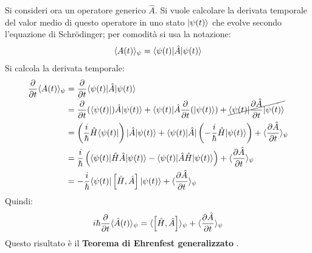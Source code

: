 Si consideri ora un operatore generico $\hat A$. Si vuole calcolare la derivata temporale del valor medio di questo operatore in uno stato $|\psi(t)\ket$ che evolve secondo l'equazione di Schrödinger; per comodità si usa la notazione:
\[
	\bra A(t) \ket_\psi = \bra \psi(t) | \hat A | \psi(t) \ket
\]
Si calcola la derivata temporale:
\begin{align*}
	\deriv[t]{} \bra A(t) \ket_\psi &= \deriv[t]{} \bra \psi(t) | \hat A | \psi(t) \ket \\
	&= \deriv[t]{} (\bra  \psi(t) |) \hat A | \psi(t) \ket + \bra \psi(t) | \hat A \deriv[t]{} (|  \psi(t) \ket) + \cancel{\bra \psi(t) | \deriv[t]{\hat A} | \psi(t) \ket} \\
	&= \left( \frac{i}{\hbar} \hat H \bra\psi(t)| \right) | \hat A | \psi(t) \ket + \bra \psi(t) | \hat A | \left( -\frac{i}{\hbar} \hat H |\psi(t)\ket \right) + \avg[\psi]{\tderiv{\hat A}} \\
	&= \frac{i}{\hbar} \left( \bra \psi(t) | \hat H \hat A | \psi(t) \ket - \bra \psi(t) | \hat A \hat H | \psi(t) \ket \right) + \avg[\psi]{\tderiv{\hat A}} \\
	&= -\frac{i}{\hbar} \bra \psi(t) | \left[ \hat H, \hat A \right] | \psi(t) \ket + \avg[\psi]{\tderiv{\hat A}}
\end{align*}
Quindi:
\[
	i \hbar \deriv[t]{} \bra \A(t) \ket_\psi = \bra \comm{\H}{\A} \ket_\psi + \avg[\psi]{\tderiv{\hat A}}
\]
Questo risultato è il \textbf{Teorema di Ehrenfest generalizzato} .